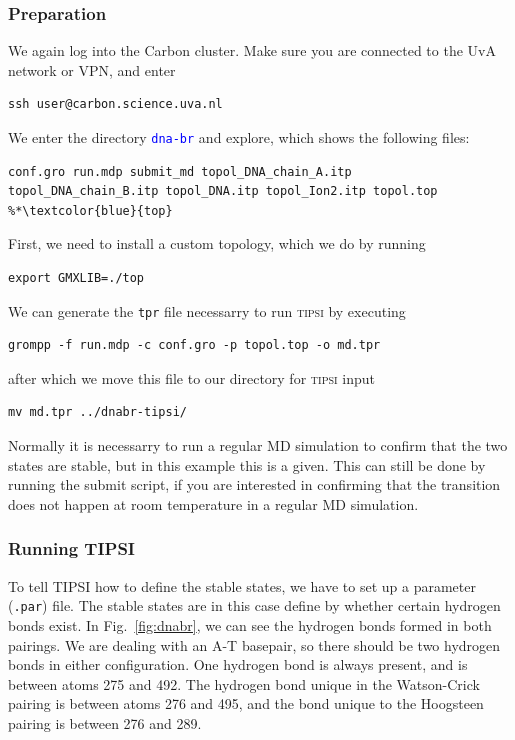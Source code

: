 \documentclass[]{article}
\begin{document}
\subsubsection*{Preparation}

We again log into the Carbon cluster. Make sure you are connected to the UvA network or VPN, and enter
%
\begin{lstlisting}
ssh user@carbon.science.uva.nl
\end{lstlisting}
%

We enter the directory \texttt{\textcolor{blue}{dna-br}} and explore, which shows the following files:
%
\begin{lstlisting}
conf.gro run.mdp submit_md topol_DNA_chain_A.itp 
topol_DNA_chain_B.itp topol_DNA.itp topol_Ion2.itp topol.top %*\textcolor{blue}{top}
\end{lstlisting}
%
First, we need to install a custom topology, which we do by running
%
\begin{lstlisting}
export GMXLIB=./top
\end{lstlisting}
%
We can generate the \texttt{tpr} file necessarry to run \textsc{tipsi} by executing
%
\begin{lstlisting}
grompp -f run.mdp -c conf.gro -p topol.top -o md.tpr
\end{lstlisting}
%
after which we move this file to our directory for \textsc{tipsi} input
%
\begin{lstlisting}
mv md.tpr ../dnabr-tipsi/
\end{lstlisting}
%
Normally it is necessarry to run a regular MD simulation to confirm that the two states are stable, but in this example this is a given. This can still be done by running the submit script, if you are interested in confirming that the transition does not happen at room temperature in a regular MD simulation.

\subsubsection*{Running TIPSI}

To tell \textsc{TIPSI} how to define the stable states, we have to set up a parameter (\texttt{.par}) file. The stable states are in this case define by whether certain hydrogen bonds exist. In Fig.~\ref{fig:dnabr}, we can see the hydrogen bonds formed in both pairings. We are dealing with an A-T basepair, so there should be two hydrogen bonds in either configuration. One hydrogen bond is always present, and is between atoms 275 and 492. The hydrogen bond unique in the Watson-Crick pairing is between atoms 276 and 495, and the bond unique to the Hoogsteen pairing is between 276 and 289.
\end{document}
